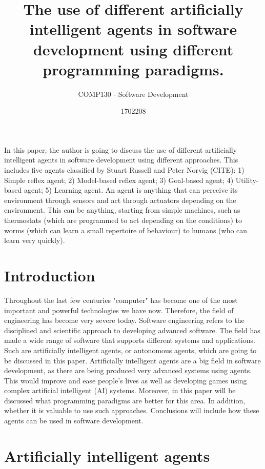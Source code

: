 \documentclass{scrartcl}
\title{The use of different artificially intelligent agents in software development using different programming paradigms.}
\subtitle{COMP130 - Software Development}
\author{1702208}
\begin{document}
\maketitle

In this paper, the author is going to discuss the use of different artificially intelligent agents in software development using different approaches.
This includes five agents classified by Stuart Russell and Peter Norvig (CITE):
1) Simple reflex agent;
2) Model-based reflex agent;
3) Goal-based agent;
4) Utility-based agent;
5) Learning agent.
An agent is anything that can perceive its environment through sensors and act through actuators depending on the environment. 
This can be anything, starting from simple machines, such as thermostats (which are programmed to act depending on the conditions) 
to worms (which can learn a small repertoire of behaviour) to humans (who can learn very quickly).

\section{Introduction}

Throughout the last few centuries "computer" has become one of the most important and powerful technologies we have now. 
Therefore, the field of engineering has become very severe today. 
Software engineering refers to the disciplined and scientific approach to developing advanced software. 
The field has made a wide range of software that supports different systems and applications. 
Such are artificially intelligent agents, or autonomous agents, which are going to be discussed in this paper. 
Artificially intelligent agents are a big field in software development, as there are being produced very advanced systems using agents.
This would improve and ease people's lives as well as developing games using complex artificial intelligent (AI) systems.
Moreover, in this paper will be discussed what programming paradigms are better for this area.
In addition, whether it is valuable to use such approaches.
Conclusions will include how these agents can be used in software development.

\section{Artificially intelligent agents}
\end{document}
